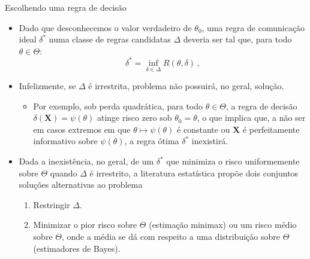 \documentclass[11pt]{beamer}
\begin{document}
	
	\begin{frame}{Escolhendo uma regra de decisão}
		\begin{itemize}
			\item Dado que desconhecemos o valor verdadeiro de $\theta_0$, uma regra de comunicação ideal $\delta^*$ numa classe de regras candidatas $\Delta$ deveria ser tal que, para todo $\theta \in \Theta$:
			$$\delta^* = \inf_{\delta \in \Delta}R(\theta,\delta)\, ,$$
			\item Infelizmente, se $\Delta$ é irrestrita, problema não possuirá, no geral, solução.
			\begin{itemize}
				\item Por exemplo, sob perda quadrática, para todo $\theta \in \Theta$, a regra de decisão $\delta(\boldsymbol{X}) = \psi(\theta)$ atinge risco zero sob $\theta_0=\theta$, o que implica que, a não ser em casos extremos em que $\theta \mapsto \psi(\theta)$ é constante ou $\boldsymbol{X}$ é perfeitamente informativo sobre $\psi(\theta)$, a regra ótima $\delta^*$ inexistirá.
			\end{itemize}
			\item Dada a inexistência, no geral, de um $\delta^*$ que minimiza o risco uniformemente sobre $\Theta$ quando $\Delta$ é irrestrito, a literatura estatística propõe dois conjuntos soluções alternativas ao problema
			\begin{enumerate}
				\item Restringir $\Delta$.
				\item Minimizar o pior risco sobre $\Theta$ (estimação minimax) ou um risco médio sobre $\Theta$, onde a média se dá com respeito a uma distribuição sobre $\Theta$ (estimadores de Bayes). 
			\end{enumerate}
		\end{itemize}
	\end{frame}
\end{document}
